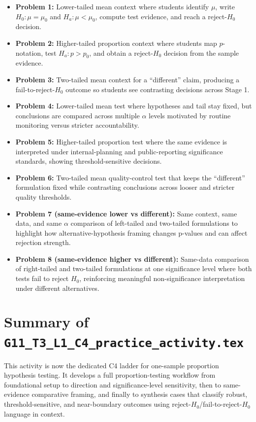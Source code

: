 \begin{itemize}
    \item \textbf{Problem 1:} Lower-tailed mean context where students identify \(\mu\), write \(H_0: \mu=\mu_0\) and \(H_a: \mu<\mu_0\), compute test evidence, and reach a reject-\(H_0\) decision.
    \item \textbf{Problem 2:} Higher-tailed proportion context where students map \(p\)-notation, test \(H_a: p>p_0\), and obtain a reject-\(H_0\) decision from the sample evidence.
    \item \textbf{Problem 3:} Two-tailed mean context for a ``different'' claim, producing a fail-to-reject-\(H_0\) outcome so students see contrasting decisions across Stage 1.
    \item \textbf{Problem 4:} Lower-tailed mean test where hypotheses and tail stay fixed, but conclusions are compared across multiple \(\alpha\) levels motivated by routine monitoring versus stricter accountability.
    \item \textbf{Problem 5:} Higher-tailed proportion test where the same evidence is interpreted under internal-planning and public-reporting significance standards, showing threshold-sensitive decisions.
    \item \textbf{Problem 6:} Two-tailed mean quality-control test that keeps the ``different'' formulation fixed while contrasting conclusions across looser and stricter quality thresholds.
    \item \textbf{Problem 7 (same-evidence lower vs different):} Same context, same data, and same \(\alpha\) comparison of left-tailed and two-tailed formulations to highlight how alternative-hypothesis framing changes p-values and can affect rejection strength.
    \item \textbf{Problem 8 (same-evidence higher vs different):} Same-data comparison of right-tailed and two-tailed formulations at one significance level where both tests fail to reject \(H_0\), reinforcing meaningful non-significance interpretation under different alternatives.
\end{itemize}

\section{Summary of \texttt{G11\_T3\_L1\_C4\_practice\_activity.tex}}
This activity is now the dedicated C4 ladder for one-sample proportion hypothesis testing. It develops a full proportion-testing workflow from foundational setup to direction and significance-level sensitivity, then to same-evidence comparative framing, and finally to synthesis cases that classify robust, threshold-sensitive, and near-boundary outcomes using reject-\(H_0\)/fail-to-reject-\(H_0\) language in context.

